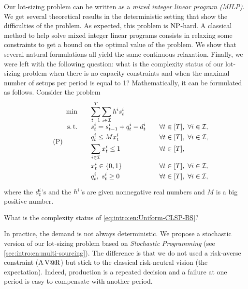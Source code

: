 Our lot-sizing problem can be written as a \emph{mixed integer linear program (MILP)}.
We get several theoretical results in the deterministic setting that show the difficulties of the problem.
As expected, this problem is $\operatorname{NP}$-hard.
A classical method to help solve mixed integer linear programs consists in relaxing some constraints to get a bound on the optimal value of the problem.
We show that several natural formulations all yield the same continuous relaxation.
Finally, we were left with the following question: what is the complexity status of our lot-sizing problem when there is no capacity constraints and when the maximal number of setups per period is equal to 1?
Mathematically, it can be formulated as follows.
Consider the problem
\begin{equation}\tag{P}\label{eq:intro:en:Uniform-CLSP-BS}
  \begin{array}{rlll}
    \min\quad & \ds \sum_{t=1}^{\horizon} \sum_{i\in\REF} \holding^i \inventory_t^i
    \\ \smallskip
    \st\quad & \ds \inventory_t^i = \inventory_{t-1}^i + \quantity_t^i - \demand_t^i && \forall t\in\range{\horizon},\ \forall i\in\REF,
    \\ \smallskip
    & \ds \quantity_t^i \le M\setup_t^i && \forall t\in\range{\horizon},\ \forall i\in\REF,
    \\ \smallskip
    & \ds \sum_{i\in\REF} \setup_t^i \le 1 && \forall t\in\range{\horizon},
    \\ \smallskip
    & \ds \setup_t^i \in \crbracket{0,1} && \forall t\in\range{\horizon},\ \forall i\in\REF,
    \\ \smallskip
    & \ds \quantity_t^i,\ \inventory_t^i \ge 0 && \forall t\in\range{\horizon},\ \forall i\in\REF,
  \end{array}
\end{equation}
where the $d_t^i$'s and the $h^i$'s are given nonnegative real numbers and $M$ is a big positive number.
\begin{question}
What is the complexity status of \eqref{eq:intro:en:Uniform-CLSP-BS}?
\end{question}


\medskip


In practice, the demand is not always deterministic.
We propose a stochastic version of our lot-sizing problem based on \emph{Stochastic Programming} (see \cref{sec:intro:en:multi-sourcing}).
The difference is that we do not used a risk-averse constraint ($\operatorname{A\operatorname{V@R}}$) but stick to the classical risk-neutral vision (the expectation).
Indeed, production is a repeated decision and a failure at one period is easy to compensate with another period.


